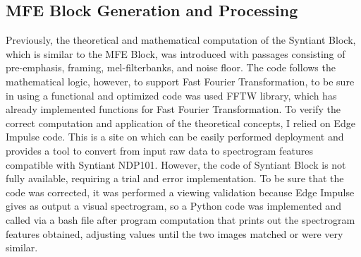 \subsection{MFE Block Generation and Processing}
\label{subsec:mfe}
Previously, the theoretical and mathematical computation of the Syntiant Block, which is similar to the MFE Block, was introduced with passages consisting of pre-emphasis, framing, mel-filterbanks, and noise floor. The code follows the mathematical logic, however, to support Fast Fourier Transformation, to be sure in using a functional and optimized code was used FFTW library, which has already implemented functions for Fast Fourier Transformation\cite{FFTW}. To verify the correct computation and application of the theoretical concepts, I relied on Edge Impulse code\cite{edgeimpulse_processing_blocks}. This is a site on which can be easily performed deployment and provides a tool to convert from input raw data to spectrogram features compatible with Syntiant NDP101. However, the code of Syntiant Block is not fully available, requiring a trial and error implementation. To be sure that the code was corrected, it was performed a viewing validation because Edge Impulse gives as output a visual spectrogram, so a Python code was implemented and called via a bash file after program computation that prints out the spectrogram features obtained, adjusting values until the two images matched or were very similar.
